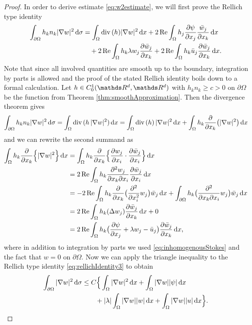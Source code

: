 \begin{proof}
  In order to derive estimate \eqref{eq:w2estimate}, we will first prove the Rellich type identity
  \begin{align}
    \label{eq:rellichIdentity3}
    \begin{alignedat}{1}
    \int_{\partial\Omega} h_k n_k |\nabla w|^2 \, {\operatorname{d}\!{\sigma}}
    &= \int_\Omega \mathrm{div\,} (h) |\nabla w|^2 \, {\operatorname{d}\!{x}} + 2 \operatorname{Re} \int_{\Omega} h_j \frac{\partial \psi}{\partial x_j} \frac{\bar w_j}{\partial x_k}\, {\operatorname{d}\!{x}}   \\
    &\quad + 2 \operatorname{Re} \int_\Omega h_k \lambda w_j \frac{\partial\bar w_j}{\partial x_k} + 2 \operatorname{Re} \int_\Omega h_k \bar u_j \frac{\partial \bar w_j}{\partial x_k} \, {\operatorname{d}\!{x}}. 
    \end{alignedat}
  \end{align} 
  Note that since all involved quantities are smooth up to the boundary, integration by parts is allowed and the proof of the stated  Rellich identity boils down to a formal calculation.
  Let $h \in C_0^1(\R^d, \R^d)$ with $h_k n_k \geq c > 0$ on $\partial \Omega$ be the function from Theorem \ref{thm:smoothApproximation}.
  Then the divergence theorem gives
  \begin{align*}
    \int_{\partial\Omega} h_k n_k |\nabla w|^2 \, {\operatorname{d}\!{\sigma}}
    = \int_{\Omega} \mathrm{div\,} (h\, |\nabla w|^2) \, {\operatorname{d}\!{x}} 
    = \int_\Omega \mathrm{div\,} (h)\, |\nabla w|^2 \, {\operatorname{d}\!{x}} + \int_\Omega h_k \frac{\partial}{\partial x_k} \big( |\nabla w|^2 \big) \, {\operatorname{d}\!{x}}
  \end{align*}
  and we can rewrite the second summand as
  \begin{align*}
    \int_{\Omega} h_k \frac{\partial}{\partial x_k} \Big\{ |\nabla w|^2 \Big\} \, {\operatorname{d}\!{x}}
    &= \int_{\Omega} h_k \frac{\partial}{\partial x_k} \Big\{ \frac{\partial w_j}{\partial x_i} \cdot \frac{\partial \bar w_j}{\partial x_i}\Big\} \, {\operatorname{d}\!{x}} \\
    &= 2 \operatorname{Re} \int_\Omega h_k \frac{\partial^2 w_j}{\partial x_k \partial x_i} \frac{\partial \bar w_j}{\partial x_i} \, {\operatorname{d}\!{x}} \\
    &= - 2 \operatorname{Re} \int_\Omega h_k \frac{\partial}{\partial x_k} \big( \frac{\partial^2}{\partial x_i^2} w_j \big) \bar w_j \, {\operatorname{d}\!{x}} + \int_{\partial\Omega} h_k \big( \frac{\partial^2}{\partial x_k \partial x_i} w_j \big) \bar w_j \, {\operatorname{d}\!{x}}\\
    &= 2 \operatorname{Re} \int_\Omega h_k ( \Delta w_j ) \frac{\partial \bar w_j}{\partial x_k} \, {\operatorname{d}\!{x}} + 0 \\
    &= 2 \operatorname{Re} \int_\Omega h_k \big( \frac{\partial \psi}{\partial x_j} + \lambda w_j - \bar u_j \big) \frac{\partial \bar w_j}{\partial x_k} \, {\operatorname{d}\!{x}},
  \end{align*}
  where in addition to integration by parts we used \eqref{eq:inhomogenousStokes} and the fact that $w = 0$ on $\partial\Omega$.
  Now we can apply the triangle inequality to the Rellich type identity \eqref{eq:rellichIdentity3} to obtain
  \begin{align}
    \int_{\partial\Omega} |\nabla w|^2 \, {\operatorname{d}\!{\sigma}} 
    &\leq C \Big\{ \int_\Omega |\nabla w|^2 \, {\operatorname{d}\!{x}} + \int_\Omega |\nabla w | |\psi| \, {\operatorname{d}\!{x}} \nonumber\\
    &\qquad + |\lambda| \int_\Omega |\nabla w| |w| \, {\operatorname{d}\!{x}} + \int_\Omega |\nabla w| |u| \, {\operatorname{d}\!{x}} \Big\}. \label{eq:rellichInequality3}
  \end{align}


\end{proof}
